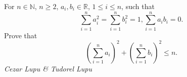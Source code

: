 For $n\in\mathbb{N}$, $n\geq 2$, $a_{i}, b_{i}\in\mathbb{R}$, $1\leq i\leq n$, such that \[\sum_{i=1}^{n}a_{i}^{2}=\sum_{i=1}^{n}b_{i}^{2}=1, \sum_{i=1}^{n}a_{i}b_{i}=0. \] Prove that
\[\left(\sum_{i=1}^{n}a_{i}\right)^{2}+\left(\sum_{i=1}^{n}b_{i}\right)^{2}\leq n. \]
\textit{Cezar Lupu & Tudorel Lupu}